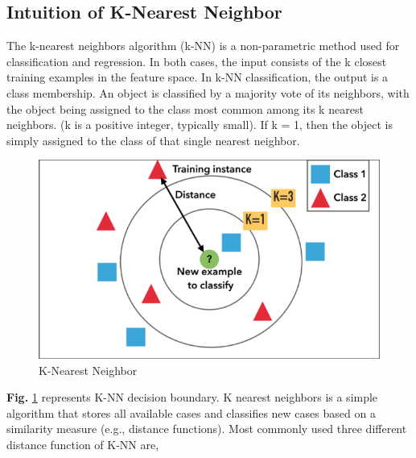 \documentclass[12pt,a4paper]{report}
\begin{document}
\subsection{Intuition of K-Nearest Neighbor}
The k-nearest neighbors algorithm (k-NN) is a non-parametric method used for classification and regression. In both cases, the input consists of the k closest training examples in the feature space. In k-NN classification, the output is a class membership. An object is classified by a majority vote of its neighbors, with the object being assigned to the class most common among its k nearest neighbors. (k is a positive integer, typically small). If k = 1, then the object is simply assigned to the class of that single nearest neighbor.
\begin{figure}[h!]
    \centering
    \includegraphics[scale=0.35]{Figures/knn.png}
    \caption{K-Nearest Neighbor}
    \label{fig:knn}
\end{figure}
\par
\noindent
\textbf{Fig.} \ref{fig:knn} represents K-NN decision boundary. K nearest neighbors is a simple algorithm that stores all available cases and classifies new cases based on a similarity measure (e.g., distance functions). Most commonly used three different distance function of K-NN are,
\end{document}
